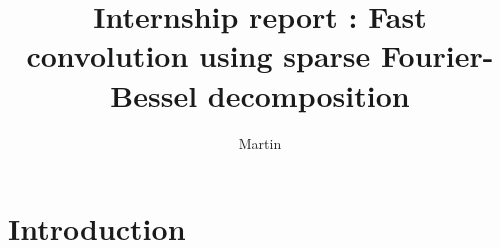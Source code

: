 \documentclass[11pt,a4paper]{article}
\title{Internship report : Fast convolution using sparse Fourier-Bessel decomposition}
\author{Martin}
\begin{document}
\renewcommand{\proofname}{Proof}
\maketitle
\theoremstyle{plain}
\newtheorem{monTheoNumrote}{Théorème}[section] %
\newtheorem*{monTheoNonNumerote}{Théorème}  %
\newtheorem{The}{Theorem}[section]
\newtheorem{Prop}{Proposition}[section]
\newtheorem*{Prop*}{Proposition} 
\newtheorem{Cor}{Corollary}[section]
\newtheorem{Conj}{Conjecture}[section]
\newtheorem{Lem}{Lemma}[section]
\theoremstyle{definition}
\newtheorem{Def}{Definition}[section]
\newtheorem{Rem}{Remark}[section]
\newcommand{\enstq}[2]{\left\{#1\mathrel{}\middle|\mathrel{}#2\right\}}
\newcommand{\Lp}[2]{L^#1(#2)}
\newcommand{\Sob}[3]{W^{#1,#2}(#3)}
\newcommand{\RN}[0]{\mathbb{R}^N}
\newcommand{\norm}[1]{\left\|#1\right\|}
\newcommand{\sinc}[0]{\textup{sinc}}
\newcommand{\functionDef}[5]{\begin{array}{lllll}
#1 & : & #2 & \longrightarrow & #3 \\
 & & #4 & \longmapsto &\displaystyle #5 \\
\end{array}}
\newcommand{\N}{\mathbb{N}}
\newcommand{\Z}{\mathbb{Z}}
\newcommand{\D}{\mathbb{D}}
\newcommand{\R}{\mathbb{R}}
\newcommand{\A}{\mathcal{A}_{a,b}}
\newcommand{\Crad}{C^\infty_{c,rad}(B)}
\newcommand{\Lrad}{L^2_{rad}(B)}
\newcommand{\Lradab}{L^2_{rad}(\mathcal{A}_{a,b})}
\newcommand{\duality}[2]{\left\langle #1,#2\right\rangle}
\newcommand{\Hrad}{H^1_{rad}(B)}
\newcommand{\Hzrad}{H^1_{0,rad}(B)}

\section*{Introduction}
\end{document}
